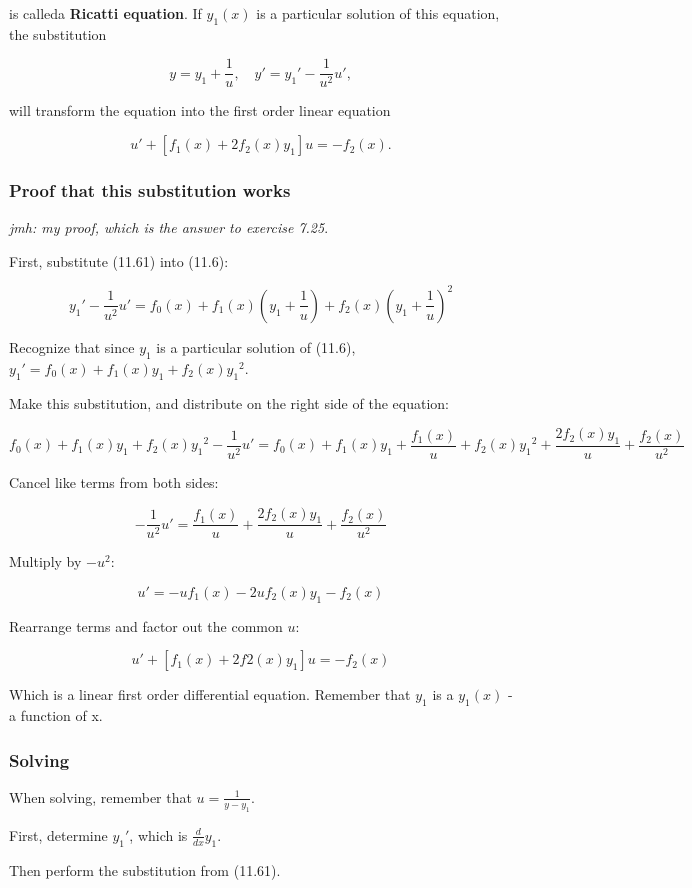 \documentclass{article}
\begin{document}
is calleda \textbf{Ricatti equation}. If $y_1(x)$ is a particular solution of this equation, the substitution

\[ \tag{11.61} y = y_1 + \frac{1}{u}, \quad y' = {y_1}' - \frac{1}{u^2}u', \]

will transform the equation into the first order linear equation

\[ \tag{11.62} u' + [f_1(x) + 2f_2(x)y_1]u = -f_2(x). \]

\subsubsection{Proof that this substitution works}

\emph{jmh: my proof, which is the answer to exercise 7.25}.

First, substitute (11.61) into (11.6):

\[ {y_1}' - \frac{1}{u^2}u' = f_0(x) + f_1(x)(y_1 + \frac{1}{u}) + f_2(x)(y_1 + \frac{1}{u})^2 \]

Recognize that since $y_1$ is a particular solution of (11.6), ${y_1}' = f_0(x) + f_1(x)y_1 + f_2(x){y_1}^2$.

Make this substitution, and distribute on the right side of the equation:

\[ f_0(x) + f_1(x)y_1 + f_2(x){y_1}^2 - \frac{1}{u^2}u' = f_0(x) + f_1(x)y_1 + \frac{f_1(x)}{u} + f_2(x){y_1}^2 + \frac{2f_2(x)y_1}{u} + \frac{f_2(x)}{u^2} \]

Cancel like terms from both sides:

\[ - \frac{1}{u^2}u' = \frac{f_1(x)}{u} + \frac{2f_2(x)y_1}{u} + \frac{f_2(x)}{u^2} \]

Multiply by $-u^2$:

\[ u' = -uf_1(x)-2uf_2(x)y_1 - f_2(x) \]

Rearrange terms and factor out the common $u$:

\[ u' + [f_1(x) + 2f2(x)y_1]u = -f_2(x) \]

Which is a linear first order differential equation. Remember that $y_1$ is a $y_1(x)$ - a function of x.

\subsubsection{Solving}

When solving, remember that $u = \frac{1}{y-y_1}$.

First, determine ${y_1}'$, which is $\frac{d}{dx}y_1$.

Then perform the substitution from (11.61).
\end{document}

